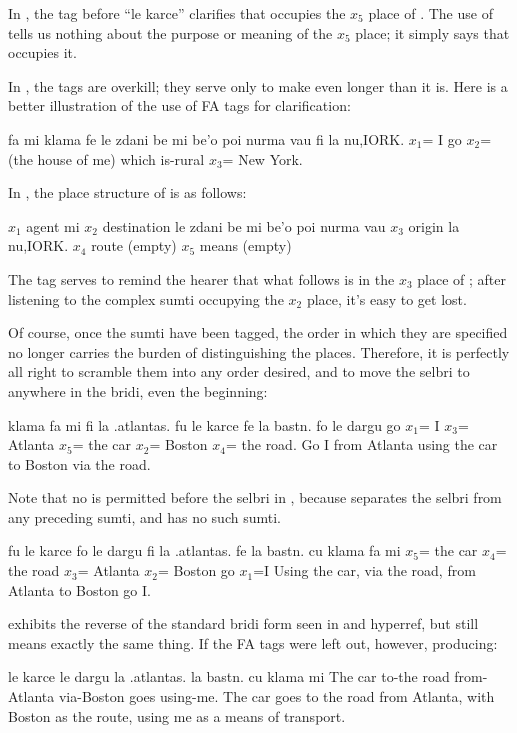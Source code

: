 In , the tag  before ``le
    karce'' clarifies that  occupies the $x_5$ place of
    . The use of  tells us nothing about the purpose
    or meaning of the $x_5$ place; it simply says that 
    occupies it. 

In , the tags are overkill;
    they serve only to make  even
    longer than it is. Here is a better illustration of the use of
    FA tags for clarification:
\begin{example}
fa mi klama fe le zdani be mi be'o poi nurma vau\n
\T	fi la nu,IORK.\n
$x_1$= I go $x_2$= (the house of me) which is-rural\n
\T	$x_3$= New York.
\end{example}

In , the place structure of
     is as follows:

   $x_1$  agent       mi
    $x_2$  destination le zdani be mi be'o poi nurma vau
    $x_3$  origin      la nu,IORK.
    $x_4$  route       (empty)
    $x_5$  means       (empty)

The  tag serves to remind the hearer that what follows is
    in the $x_3$ place of ; after listening to the complex
    sumti occupying the $x_2$ place, it's easy to get lost. 

Of course, once the sumti have been tagged, the order in
    which they are specified no longer carries the burden of
    distinguishing the places. Therefore, it is perfectly all right
    to scramble them into any order desired, and to move the selbri
    to anywhere in the bridi, even the beginning:
\begin{example}
klama fa mi fi la .atlantas.\n
\T	fu le karce fe la bastn. fo le dargu\n
go $x_1$= I $x_3$= Atlanta\n
\T	$x_5$= the car $x_2$= Boston $x_4$= the road.\n
Go I from Atlanta using the car to Boston via the road.
\end{example}

Note that no  is permitted before the selbri in , because  separates the
    selbri from any preceding sumti, and  has no such sumti.
\begin{example}
fu le karce fo le dargu fi la .atlantas.\n
\T	fe la bastn. cu klama fa mi\n
$x_5$= the car $x_4$= the road $x_3$= Atlanta\n
\T	$x_2$= Boston go $x_1$=I\n
Using the car, via the road, from Atlanta to Boston\n
\T	go I.
\end{example}

 exhibits the reverse of the
    standard bridi form seen in 
    and hyperref, but still means exactly the same
    thing. If the FA tags were left out, however, producing:
\begin{example}
le karce le dargu la .atlantas.\n
\T	la bastn. cu klama mi\n
The car to-the road from-Atlanta\n
\T	via-Boston goes using-me.\n
The car goes to the road from Atlanta, with Boston\n
\T	as the route, using me as a means\n
\T	of transport.
\end{example}

